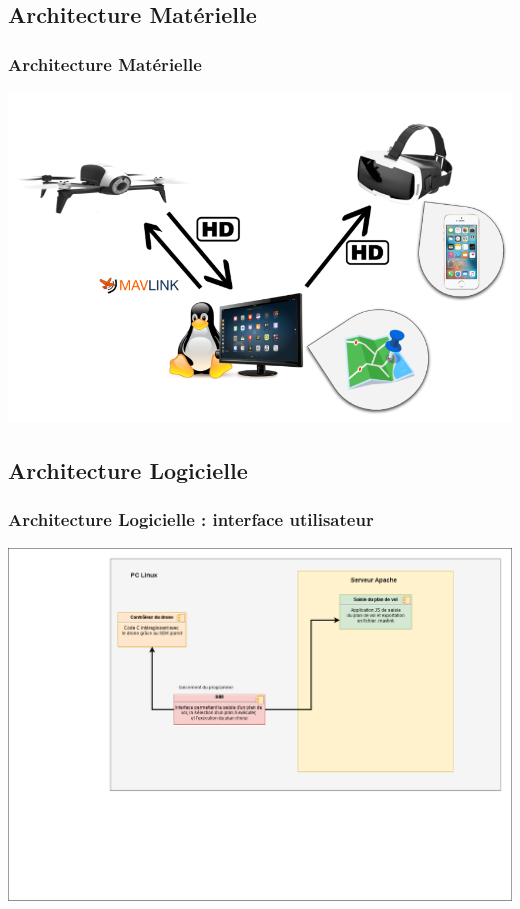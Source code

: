 \documentclass{beamer}
\begin{document}


	\begin{frame}
		\section{Architecture Matérielle}
		\begin{center}
		\frametitle{Architecture Matérielle}

       
        \includegraphics[scale=0.6]{archi_materielle.png}
		\end{center}
	\end{frame}
	


	\begin{frame}
	\section{Architecture Logicielle}
		\begin{center}
		\frametitle{Architecture Logicielle : interface utilisateur}

       
        \includegraphics[scale=0.24]{01_archi_logicielle_IHM.png}
		\end{center}
	\end{frame}
	
\end{document}
